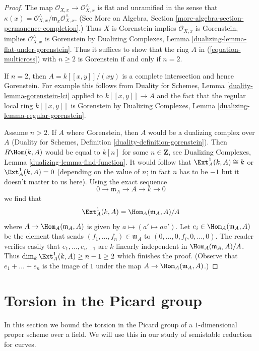 \begin{proof}
The map $\mathcal{O}_{X, x} \to \mathcal{O}_{X, x}^\wedge$
is flat and unramified in the sense that
$\kappa(x) = \mathcal{O}_{X, x}^\wedge/\mathfrak m_x \mathcal{O}_{X, x}^\wedge$.
(See More on Algebra, Section \ref{more-algebra-section-permanence-completion}.)
Thus $X$ is Gorenstein implies $\mathcal{O}_{X, x}$ is Gorenstein, implies
$\mathcal{O}_{X, x}^\wedge$ is Gorenstein by
Dualizing Complexes, Lemma \ref{dualizing-lemma-flat-under-gorenstein}.
Thus it suffices to show that the ring $A$ in
(\ref{equation-multicross}) with $n \geq 2$
is Gorenstein if and only if $n = 2$.

\medskip\noindent
If $n = 2$, then $A = k[[x, y]]/(xy)$ is a complete intersection
and hence Gorenstein. For example this follows from
Duality for Schemes, Lemma \ref{duality-lemma-gorenstein-lci}
applied to $k[[x, y]] \to A$ and the fact that the regular
local ring $k[[x, y]]$ is Gorenstein by
Dualizing Complexes, Lemma \ref{dualizing-lemma-regular-gorenstein}.

\medskip\noindent
Assume $n > 2$. If $A$ where Gorenstein, then $A$ would be a
dualizing complex over $A$
(Duality for Schemes, Definition \ref{duality-definition-gorenstein}).
Then $R\Hom(k, A)$ would be equal to $k[n]$ for some $n \in \mathbf{Z}$, see
Dualizing Complexes, Lemma \ref{dualizing-lemma-find-function}.
It would follow that $\Ext^1_A(k, A) \cong k$
or $\Ext^1_A(k, A) = 0$ (depending on the value of $n$;
in fact $n$ has to be $-1$ but it doesn't matter to us here).
Using the exact sequence
$$
0 \to \mathfrak m_A \to A \to k \to 0
$$
we find that
$$
\Ext^1_A(k, A) = \Hom_A(\mathfrak m_A, A)/A
$$
where $A \to \Hom_A(\mathfrak m_A, A)$ is given by
$a \mapsto (a' \mapsto aa')$. Let $e_i \in \Hom_A(\mathfrak m_A, A)$
be the element that sends $(f_1, \ldots, f_n) \in \mathfrak m_A$ to
$(0, \ldots, 0, f_i, 0, \ldots, 0)$. The reader verifies easily
that $e_1, \ldots, e_{n - 1}$ are $k$-linearly independent in
$\Hom_A(\mathfrak m_A, A)/A$. Thus
$\dim_k \Ext^1_A(k, A) \geq n - 1 \geq 2$ which
finishes the proof.
(Observe that $e_1 + \ldots + e_n$ is the image of $1$ under the map
$A \to \Hom_A(\mathfrak m_A, A)$.)
\end{proof}

\section{Torsion in the Picard group}
\label{curves-section-torsion-in-pic}
In this section we bound the torsion in the Picard group of a $1$-dimensional
proper scheme over a field. We will use this in our
study of semistable reduction for curves.

